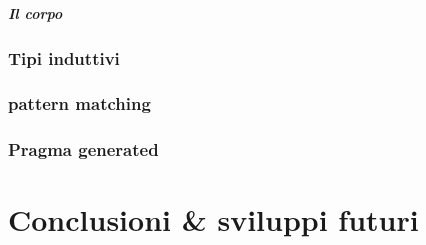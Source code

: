 \documentclass[12pt,a4paper]{report}
\begin{document}
\paragraph{Il corpo}

\subsection{Tipi induttivi}

\subsection{pattern matching}

\subsection{Pragma generated}

\chapter{Conclusioni \& sviluppi futuri}

\end{document}
